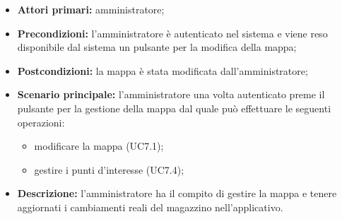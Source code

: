 \begin{itemize}
	\item 	\textbf{Attori primari:} amministratore;
	\item 	\textbf{Precondizioni:} l'amministratore è autenticato nel sistema e viene reso disponibile dal sistema un pulsante per la modifica della mappa;
	\item 	\textbf{Postcondizioni:} la mappa è stata modificata dall'amministratore;
	\item 	\textbf{Scenario principale:} l'amministratore una volta autenticato preme il pulsante per la gestione della mappa dal quale può effettuare le seguenti operazioni:
	\begin{itemize}
		\item modificare la mappa (UC7.1);
		\item gestire i punti d'interesse (UC7.4);
	\end{itemize}
	\item 	\textbf{Descrizione:} l'amministratore ha il compito di gestire la mappa e tenere aggiornati i cambiamenti reali del magazzino nell'applicativo.
\end{itemize}


